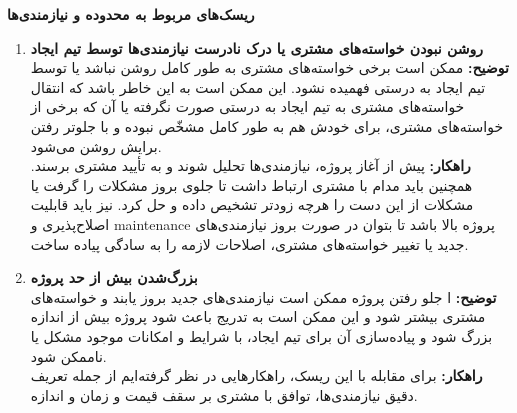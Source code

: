 \large \textbf{ریسک‌های مربوط به محدوده و نیازمندی‌ها}
\begin{enumerate}[start = 9]       
    \item \textbf{روشن نبودن خواسته‌های مشتری یا درک نادرست نیازمندی‌ها توسط تیم ایجاد}
       \\\textbf{توضیح: }
        ممکن است برخی خواسته‌های مشتری به طور کامل روشن نباشد یا توسط تیم ایجاد به درستی فهمیده نشود. این ممکن است به این خاطر باشد که انتقال خواسته‌های مشتری به تیم ایجاد به درستی صورت نگرفته یا آن که برخی از خواسته‌های مشتری، برای خودش هم به طور کامل مشخّص نبوده و با جلوتر رفتن برایش روشن می‌شود.
       \\\textbf{راهکار: }
        پیش از آغاز پروژه، نیازمندی‌ها تحلیل شوند و به تأیید مشتری برسند. همچنین باید مدام با مشتری ارتباط داشت تا جلوی بروز مشکلات را گرفت یا مشکلات از این دست را هرچه زودتر تشخیص داده و حل کرد. نیز باید قابلیت اصلاح‌پذیری و maintenance پروژه بالا باشد تا بتوان در صورت بروز نیازمندی‌های جدید یا تغییر خواسته‌های مشتری، اصلاحات لازمه را به سادگی پیاده ساخت.
    \item \textbf{بزرگ‌شدن بیش از حد پروژه}
       \\\textbf{توضیح: }
        ا جلو رفتن پروژه ممکن است نیازمندی‌های جدید بروز یابند و خواسته‌های مشتری بیشتر شود و این ممکن است به تدریج باعث شود پروژه بیش از اندازه بزرگ شود و پیاده‌سازی آن برای تیم ایجاد، با شرایط و امکانات موجود مشکل یا ناممکن شود.
       \\\textbf{راهکار: }
        برای مقابله با این ریسک، راهکارهایی در نظر گرفته‌ایم از جمله تعریف دقیق نیازمندی‌ها، توافق با مشتری بر سقف قیمت و زمان و اندازه.
    \end{enumerate}

